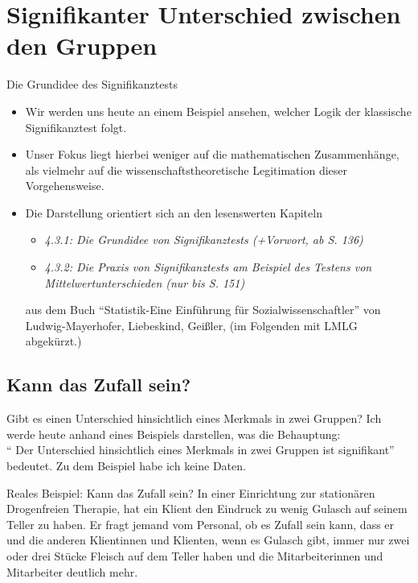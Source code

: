 \documentclass[usenames,dvipsnames,handout]{beamer}
\begin{document}
\section{Signifikanter Unterschied zwischen den Gruppen}

\begin{frame}{Die Grundidee des Signifikanztests}
\begin{itemize}
\item{Wir werden uns heute an einem Beispiel   ansehen, welcher Logik der klassische
Signifikanztest folgt. }\pause
\item{Unser Fokus liegt  hierbei weniger auf die mathematischen
Zusammenhänge, als vielmehr auf die wissenschaftstheoretische Legitimation dieser Vorgehensweise.}\pause
\item{Die Darstellung orientiert sich an den  lesenswerten Kapiteln 
\begin{itemize}
\item{\textit{4.3.1: Die Grundidee von Signifikanztests (+Vorwort, ab S. 136)}}
\item{\textit{4.3.2: Die Praxis von Signifikanztests am Beispiel des Testens von Mittelwertunterschieden (nur bis S. 151)}}
\end{itemize} aus dem Buch ``Statistik-Eine Einführung für Sozialwissenschaftler'' von Ludwig-Mayerhofer, Liebeskind, Geißler,
(im Folgenden mit LMLG abgekürzt.)
 }
\end{itemize}
\end{frame}
\subsection{Kann das Zufall sein?}


\begin{frame}{Gibt es einen Unterschied hinsichtlich eines Merkmals in zwei Gruppen?}
Ich  werde heute anhand eines Beispiels darstellen, was die Behauptung:\\ `` Der Unterschied 
 hinsichtlich eines Merkmals in zwei Gruppen ist signifikant'' bedeutet. Zu dem Beispiel habe ich keine Daten.
 \begin{block}{Reales Beispiel: Kann das Zufall sein?}
 In einer Einrichtung zur stationären Drogenfreien Therapie, hat ein Klient den Eindruck zu wenig Gulasch auf 
 seinem Teller zu haben. Er fragt jemand vom Personal, ob es Zufall sein kann, dass er und
 die anderen Klientinnen und Klienten, wenn es Gulasch gibt, immer nur zwei oder drei Stücke Fleisch auf dem Teller
 haben und die Mitarbeiterinnen und Mitarbeiter deutlich mehr.
 \end{block}
\end{frame}
\end{document}
